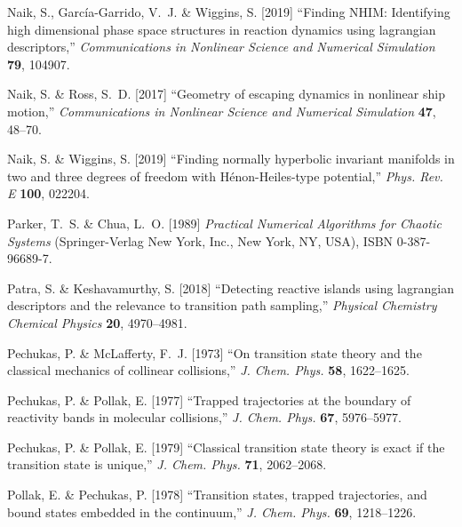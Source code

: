 \documentclass{ws-ijbc}
\begin{document}
\begin{thebibliography}{76}
	Naik, S., García-Garrido, V.~J. \& Wiggins, S. [2019] \enquote{Finding {NHIM}:
		Identifying high dimensional phase space structures in reaction dynamics
		using lagrangian descriptors,} \emph{Communications in Nonlinear Science and
		Numerical Simulation} \textbf{79},  104907.
	
	Naik, S. \& Ross, S.~D. [2017] \enquote{Geometry of escaping dynamics in
		nonlinear ship motion,} \emph{Communications in Nonlinear Science and
		Numerical Simulation} \textbf{47},  48--70.
	
	Naik, S. \& Wiggins, S. [2019] \enquote{{Finding normally hyperbolic invariant
			manifolds in two and three degrees of freedom with H\'enon-Heiles-type
			potential},} \emph{Phys. Rev. E} \textbf{100},  022204.
	
	Parker, T.~S. \& Chua, L.~O. [1989] \emph{Practical Numerical Algorithms for
		Chaotic Systems} (Springer-Verlag New York, Inc., New York, NY, USA), ISBN
	0-387-96689-7.
	
	Patra, S. \& Keshavamurthy, S. [2018] \enquote{Detecting reactive islands using
		lagrangian descriptors and the relevance to transition path sampling,}
	\emph{Physical Chemistry Chemical Physics} \textbf{20},  4970--4981.
	
	Pechukas, P. \& McLafferty, F.~J. [1973] \enquote{{On transition state theory
			and the classical mechanics of collinear collisions},} \emph{J. Chem. Phys.}
	\textbf{58},  1622--1625.
	
	Pechukas, P. \& Pollak, E. [1977] \enquote{{Trapped trajectories at the
			boundary of reactivity bands in molecular collisions},} \emph{J. Chem. Phys.}
	\textbf{67},  5976--5977.
	
	Pechukas, P. \& Pollak, E. [1979] \enquote{{Classical transition state theory
			is exact if the transition state is unique},} \emph{J. Chem. Phys.}
	\textbf{71},  2062--2068.
	
	Pollak, E. \& Pechukas, P. [1978] \enquote{{Transition states, trapped
			trajectories, and bound states embedded in the continuum},} \emph{J. Chem.
		Phys.} \textbf{69},  1218--1226.
	

\end{thebibliography}
\end{document}
